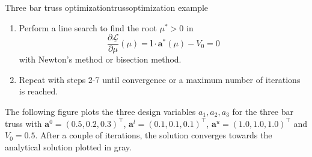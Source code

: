 \begin{example}{Three bar truss optimization}{trussoptimization example}
\begin{enumerate}
\begin{align}
{{                (L^k_j-a^k_j)^2}{\mu l_j}} \\
                \mathbf{a}^* (\mu) &= \max\left(\tilde{\mathbf{a}}^{l,k}, \min \left(\hat{\mathbf{a}}(\mu), \mathbf{a}_u \right)\right)
            \end{align}
            to define the dual function 
            \begin{equation}
                \underline{\mathcal{L}}(\mu) = \mathcal{L}(\mathbf{a}^* (\mu), \mu)
            \end{equation}
        \item Perform a line search to find the root $\mu^*>0$ in 
        \begin{equation}
            \frac{\partial \underline{\mathcal{L}}}{\partial \mu}(\mu) = \mathbf{l} \cdot \mathbf{a}^* (\mu) - V_0 = 0
        \end{equation}
        with Newton's method or bisection method. 
        \item Repeat with steps 2-7 until convergence or a maximum number of iterations is reached.
    \end{enumerate}

    The following figure plots the three design variables $a_1, a_2, a_3$ for the three bar truss with $\mathbf{a}^0=(0.5,0.2,0.3)^\top$, $\mathbf{a}^l=(0.1,0.1,0.1)^\top$, $\mathbf{a}^u=(1.0,1.0,1.0)^\top$ and $V_0=0.5$. After a couple of iterations, the solution converges towards the analytical solution plotted in gray.


\end{example}
